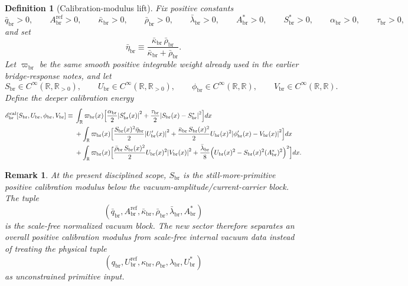\documentclass[11pt]{article}
\newcommand{\ProfWeight}{\varpi_{\mathrm{br}}}
\newcommand{\RespVacAmp}{U_{\mathrm{br}}}
\newcommand{\RespVacRef}{U_{\mathrm{br}}^{\mathrm{ref}}}
\newcommand{\RespVacEq}{U_{\mathrm{br}}^{\ast}}
\newcommand{\RespVacPhase}{\phi_{\mathrm{br}}}
\newcommand{\RespVacCarrier}{V_{\mathrm{br}}}
\newcommand{\RespVacReadout}{q_{\mathrm{br}}}
\newcommand{\RespVacCov}{\kappa_{\mathrm{br}}}
\newcommand{\RespVacRelax}{\rho_{\mathrm{br}}}
\newcommand{\RespVacWell}{\lambda_{\mathrm{br}}}
\newcommand{\RespScaleField}{S_{\mathrm{br}}}
\newcommand{\RespScaleEq}{S_{\mathrm{br}}^{\ast}}
\newcommand{\RespScaleAmpRef}{A_{\mathrm{br}}^{\mathrm{ref}}}
\newcommand{\RespScaleAmpEq}{A_{\mathrm{br}}^{\ast}}
\newcommand{\RespScaleReadout}{\bar q_{\mathrm{br}}}
\newcommand{\RespScaleCov}{\bar\kappa_{\mathrm{br}}}
\newcommand{\RespScaleRelax}{\bar\rho_{\mathrm{br}}}
\newcommand{\RespScaleWell}{\bar\lambda_{\mathrm{br}}}
\newcommand{\RespScaleIso}{\bar\eta_{\mathrm{br}}}
\newcommand{\RespScaleGrad}{\alpha_{\mathrm{br}}}
\newcommand{\RespScaleAnchor}{\tau_{\mathrm{br}}}
\newcommand{\RespScaleEnergy}{\mathscr E_{\mathrm{br}}^{\mathrm{cal}}}
\newtheorem{definition}{Definition}
\newtheorem{remark}{Remark}
\begin{document}
\begin{definition}[Calibration-modulus lift]
\label{def:calsector}
Fix positive constants
\begin{equation}
\RespScaleReadout>0,
\qquad
\RespScaleAmpRef>0,
\qquad
\RespScaleCov>0,
\qquad
\RespScaleRelax>0,
\qquad
\RespScaleWell>0,
\qquad
\RespScaleAmpEq>0,
\qquad
\RespScaleEq>0,
\qquad
\RespScaleGrad>0,
\qquad
\RespScaleAnchor>0,
\label{eq:calconstants}
\end{equation}
and set
\begin{equation}
\RespScaleIso\equiv \frac{\RespScaleCov\,\RespScaleRelax}{\RespScaleCov+\RespScaleRelax}.
\label{eq:caliso}
\end{equation}
Let \(\ProfWeight\) be the same smooth positive integrable weight already used in the earlier bridge-response notes, and let
\begin{equation}
\RespScaleField\in C^\infty(\mathbb R,\mathbb R_{>0}),
\qquad
\RespVacAmp\in C^\infty(\mathbb R,\mathbb R_{>0}),
\qquad
\RespVacPhase\in C^\infty(\mathbb R,\mathbb R),
\qquad
\RespVacCarrier\in C^\infty(\mathbb R,\mathbb R).
\label{eq:calfields}
\end{equation}
Define the deeper calibration energy
\begin{align}
\RespScaleEnergy[\RespScaleField,\RespVacAmp,\RespVacPhase,\RespVacCarrier]
\equiv\;&
\int_{\mathbb R}\ProfWeight(x)\Bigl[
\frac{\RespScaleGrad}{2}\abs{\RespScaleField'(x)}^2
+
\frac{\RespScaleAnchor}{2}\abs{\RespScaleField(x)-\RespScaleEq}^2
\Bigr]dx
\nonumber\\
&+
\int_{\mathbb R}\ProfWeight(x)\Bigl[
\frac{\RespScaleField(x)^2\RespScaleIso}{2}\abs{\RespVacAmp'(x)}^2
+
\frac{\RespScaleCov\,\RespScaleField(x)^2}{2}\RespVacAmp(x)^2\abs{\RespVacPhase'(x)-\RespVacCarrier(x)}^2
\Bigr]dx
\nonumber\\
&+
\int_{\mathbb R}\ProfWeight(x)\Bigl[
\frac{\RespScaleRelax\,\RespScaleField(x)^2}{2}\RespVacAmp(x)^2\abs{\RespVacCarrier(x)}^2
+
\frac{\RespScaleWell}{8}\Bigl(\RespVacAmp(x)^2-\RespScaleField(x)^2(\RespScaleAmpEq)^2\Bigr)^2
\Bigr]dx.
\label{eq:calenergy}
\end{align}
\end{definition}

\begin{remark}
At the present disciplined scope, \(\RespScaleField\) is the still-more-primitive positive calibration modulus below the vacuum-amplitude/current-carrier block. The tuple
\[
(\RespScaleReadout,\RespScaleAmpRef,\RespScaleCov,\RespScaleRelax,\RespScaleWell,\RespScaleAmpEq)
\]
is the scale-free normalized vacuum block. The new sector therefore separates an overall positive calibration modulus from scale-free internal vacuum data instead of treating the physical tuple
\[
(\RespVacReadout,\RespVacRef,\RespVacCov,\RespVacRelax,\RespVacWell,\RespVacEq)
\]
as unconstrained primitive input.
\end{remark}
\end{document}
